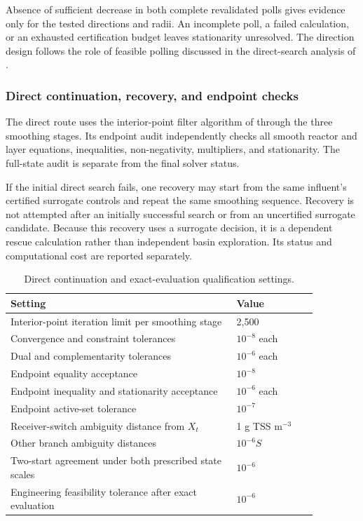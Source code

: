 Absence of sufficient decrease in both complete revalidated polls gives evidence only for the tested directions and radii. An incomplete poll, a failed calculation, or an exhausted certification budget leaves stationarity unresolved. The direction design follows the role of feasible polling discussed in the direct-search analysis of \citet{AudetDennis2006}.

\subsubsection{Direct continuation, recovery, and endpoint checks}

The direct route uses the interior-point filter algorithm of \citet{WachterBiegler2006} through the three smoothing stages. Its endpoint audit independently checks all smooth reactor and layer equations, inequalities, non-negativity, multipliers, and stationarity. The full-state audit is separate from the final solver status.

If the initial direct search fails, one recovery may start from the same influent's certified surrogate controls and repeat the same smoothing sequence. Recovery is not attempted after an initially successful search or from an uncertified surrogate candidate. Because this recovery uses a surrogate decision, it is a dependent rescue calculation rather than independent basin exploration. Its status and computational cost are reported separately.

\begin{table}[htbp]
\centering\small
\caption{Direct continuation and exact-evaluation qualification settings.}\label{tab:plant_direct_settings}
\begin{tabular}{p{0.64\linewidth}p{0.23\linewidth}}
\toprule Setting & Value\\\midrule
Interior-point iteration limit per smoothing stage & 2{,}500\\
Convergence and constraint tolerances & $10^{-8}$ each\\
Dual and complementarity tolerances & $10^{-6}$ each\\
Endpoint equality acceptance & $10^{-8}$\\
Endpoint inequality and stationarity acceptance & $10^{-6}$ each\\
Endpoint active-set tolerance & $10^{-7}$\\
Receiver-switch ambiguity distance from $X_t$ & 1 g TSS m$^{-3}$\\
Other branch ambiguity distances & $10^{-6}S$\\
Two-start agreement under both prescribed state scales & $10^{-6}$\\
Engineering feasibility tolerance after exact evaluation & $10^{-6}$\\
\bottomrule
\end{tabular}
\end{table}

